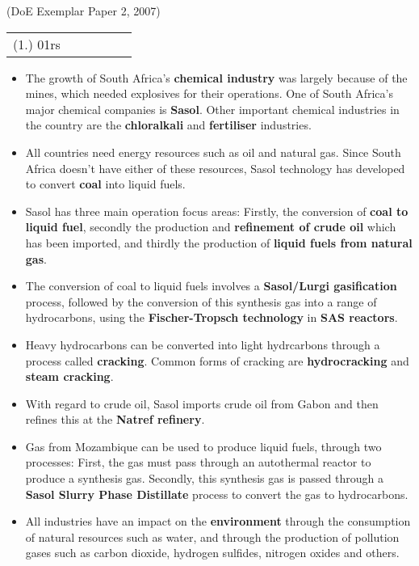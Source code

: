 {(DoE Exemplar Paper 2, 2007)

\par \practiceinfo
\par \begin{tabular}[h]{cccccc}
(1.)	01rs	&
\end{tabular}
}


\begin{itemize}
\item{The growth of South Africa's \textbf{chemical industry} was largely because of the mines, which needed explosives for their operations. One of South Africa's major chemical companies is \textbf{Sasol}. Other important chemical industries in the country are the \textbf{chloralkali} and \textbf{fertiliser} industries.}
\item{All countries need energy resources such as oil and natural gas. Since South Africa doesn't have either of these resources, Sasol technology has developed to convert \textbf{coal} into liquid fuels.}
\item{Sasol has three main operation focus areas: Firstly, the conversion of \textbf{coal to liquid fuel}, secondly the production and \textbf{refinement of crude oil} which has been imported, and thirdly the production of \textbf{liquid fuels from natural gas}.}
\item{The conversion of coal to liquid fuels involves a \textbf{Sasol/Lurgi gasification} process, followed by the conversion of this synthesis gas into a range of hydrocarbons, using the \textbf{Fischer-Tropsch technology} in \textbf{SAS reactors}.}
\item{Heavy hydrocarbons can be converted into light hydrcarbons through a process called \textbf{cracking}. Common forms of cracking are \textbf{hydrocracking} and \textbf{steam cracking}.}
\item{With regard to crude oil, Sasol imports crude oil from Gabon and then refines this at the \textbf{Natref refinery}.}
\item{Gas from Mozambique can be used to produce liquid fuels, through two processes: First, the gas must pass through an autothermal reactor to produce a synthesis gas. Secondly, this synthesis gas is passed through a \textbf{Sasol Slurry Phase Distillate} process to convert the gas to hydrocarbons.}
\item{All industries have an impact on the \textbf{environment} through the consumption of natural resources such as water, and through the production of pollution gases such as carbon dioxide, hydrogen sulfides, nitrogen oxides and others.}

\end{itemize}
